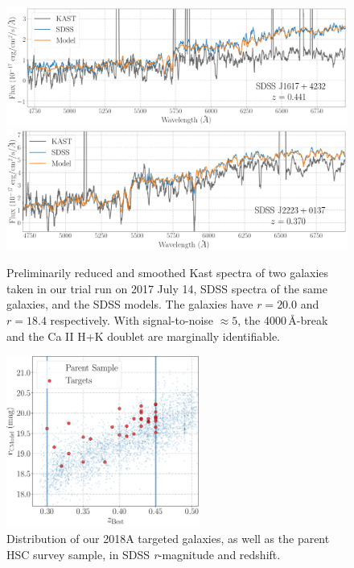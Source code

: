 \documentclass[letterpaper,12pt]{article}
\begin{document}
\begin{figure}[hbt]
\includegraphics[width=4.7in]{J1617.pdf}
\includegraphics[width=4.7in]{J2223.pdf}
\caption{
Preliminarily reduced and smoothed Kast spectra of two galaxies taken in our trial run on 2017 July 14, SDSS
spectra of the same galaxies, and the SDSS models. The galaxies have $r=20.0$ and $r=18.4$ respectively. With
signal-to-noise $\approx5$, the 4000\,\AA-break and the Ca II H+K doublet are marginally identifiable.}
\end{figure}

\begin{figure}
\includegraphics[width=2.5in]{s16a_massive_photoz_pair_gama_kast_targets.pdf}
\caption{
Distribution of our 2018A targeted galaxies, as well as the parent HSC survey sample, in SDSS {\it r}-magnitude and
redshift.}
\end{figure}
\end{document}
